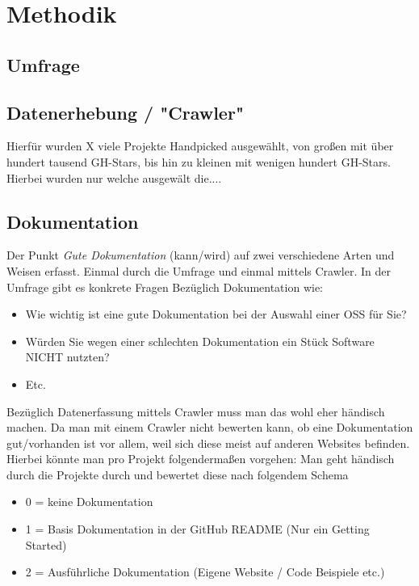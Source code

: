\chapter{Methodik}

\section{Umfrage}


\section{Datenerhebung / "Crawler"}
Hierfür wurden X viele Projekte Handpicked ausgewählt, von großen mit über hundert tausend GH-Stars, bis hin
zu kleinen mit wenigen hundert GH-Stars. Hierbei wurden nur welche ausgewält die....


\section{Dokumentation}

Der Punkt \textit{Gute Dokumentation} (kann/wird) auf zwei verschiedene Arten und Weisen erfasst.
Einmal durch die Umfrage und einmal mittels Crawler. In der Umfrage gibt es konkrete Fragen Bezüglich
Dokumentation wie:
\begin{itemize}
    \item Wie wichtig ist eine gute Dokumentation bei der Auswahl einer OSS für Sie?
    \item Würden Sie wegen einer schlechten Dokumentation ein Stück Software NICHT nutzten?
    \item Etc.
\end{itemize}

Bezüglich Datenerfassung mittels Crawler muss man das wohl eher händisch machen. Da man mit einem
Crawler nicht bewerten kann, ob eine Dokumentation gut/vorhanden ist vor allem, weil sich diese
meist auf anderen Websites befinden. Hierbei könnte man pro Projekt folgendermaßen vorgehen:
Man geht händisch durch die Projekte durch und bewertet diese nach folgendem Schema

\begin{itemize}
    \item 0 = keine Dokumentation
    \item 1 = Basis Dokumentation in der GitHub README (Nur ein Getting Started)
    \item 2 = Ausführliche Dokumentation (Eigene Website / Code Beispiele etc.)
\end{itemize}
